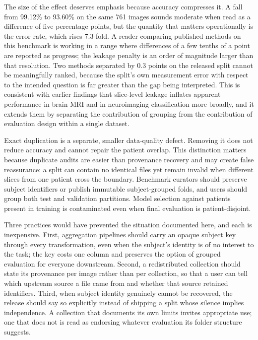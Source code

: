 ﻿\documentclass[11pt]{article}
\begin{document}
The size of the effect deserves emphasis because accuracy compresses it. A fall from 99.12\% to 93.60\% on the same 761 images sounds moderate when read as a difference of five percentage points, but the quantity that matters operationally is the error rate, which rises 7.3-fold. A reader comparing published methods on this benchmark is working in a range where differences of a few tenths of a point are reported as progress; the leakage penalty is an order of magnitude larger than that resolution. Two methods separated by 0.3 points on the released split cannot be meaningfully ranked, because the split's own measurement error with respect to the intended question is far greater than the gap being interpreted. This is consistent with earlier findings that slice-level leakage inflates apparent performance in brain MRI and in neuroimaging classification more broadly\cite{yagis2021effect,wen2020convolutional}, and it extends them by separating the contribution of grouping from the contribution of evaluation design within a single dataset.

Exact duplication is a separate, smaller data-quality defect. Removing it does not reduce accuracy and cannot repair the patient overlap. This distinction matters because duplicate audits are easier than provenance recovery and may create false reassurance: a split can contain no identical files yet remain invalid when different slices from one patient cross the boundary. Benchmark curators should preserve subject identifiers or publish immutable subject-grouped folds, and users should group both test and validation partitions. Model selection against patients present in training is contaminated even when final evaluation is patient-disjoint.

Three practices would have prevented the situation documented here, and each is inexpensive. First, aggregation pipelines should carry an opaque subject key through every transformation, even when the subject's identity is of no interest to the task; the key costs one column and preserves the option of grouped evaluation for everyone downstream. Second, a redistributed collection should state its provenance per image rather than per collection, so that a user can tell which upstream source a file came from and whether that source retained identifiers. Third, when subject identity genuinely cannot be recovered, the release should say so explicitly instead of shipping a split whose silence implies independence. A collection that documents its own limits invites appropriate use; one that does not is read as endorsing whatever evaluation its folder structure suggests.
\end{document}
